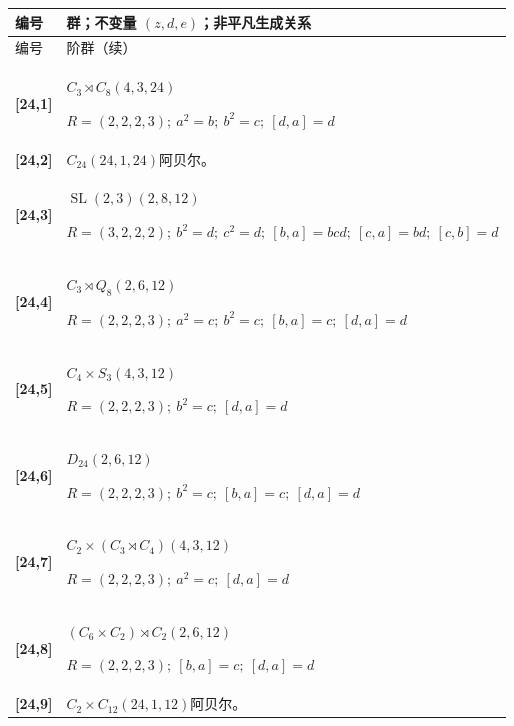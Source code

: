 \documentclass[UTF8,fontset=fandol,11pt,a4paper]{ctexart}
\begin{document}
\begin{longtable}{@{}p{17mm}>{\raggedright\arraybackslash}p{141mm}@{}}

\toprule 编号 & 群；不变量 $(z,d,e)$；非平凡生成关系\\\midrule\endfirsthead

\toprule 编号 & 24 阶群（续）\\\midrule\endhead\bottomrule\endfoot

\textbf{[24,1]} & $C_{3}\rtimes C_{8}$\quad $(4,3,24)$\par\(R=(2,2,2,3);\allowbreak\ a^{2}=b;\allowbreak\ b^{2}=c;\allowbreak\ [d,a]=d\)\\[3pt]

\textbf{[24,2]} & $C_{24}$\quad $(24,1,24)$\quad 阿贝尔。\\[3pt]

\textbf{[24,3]} & $\operatorname{SL}(2,3)$\quad $(2,8,12)$\par\(R=(3,2,2,2);\allowbreak\ b^{2}=d;\allowbreak\ c^{2}=d;\allowbreak\ [b,a]=bcd;\allowbreak\ [c,a]=bd;\allowbreak\ [c,b]=d\)\\[3pt]

\textbf{[24,4]} & $C_{3}\rtimes Q_{8}$\quad $(2,6,12)$\par\(R=(2,2,2,3);\allowbreak\ a^{2}=c;\allowbreak\ b^{2}=c;\allowbreak\ [b,a]=c;\allowbreak\ [d,a]=d\)\\[3pt]

\textbf{[24,5]} & $C_{4}\times S_{3}$\quad $(4,3,12)$\par\(R=(2,2,2,3);\allowbreak\ b^{2}=c;\allowbreak\ [d,a]=d\)\\[3pt]

\textbf{[24,6]} & $D_{24}$\quad $(2,6,12)$\par\(R=(2,2,2,3);\allowbreak\ b^{2}=c;\allowbreak\ [b,a]=c;\allowbreak\ [d,a]=d\)\\[3pt]

\textbf{[24,7]} & $C_{2}\times (C_{3}\rtimes C_{4})$\quad $(4,3,12)$\par\(R=(2,2,2,3);\allowbreak\ a^{2}=c;\allowbreak\ [d,a]=d\)\\[3pt]

\textbf{[24,8]} & $(C_{6}\times C_{2})\rtimes C_{2}$\quad $(2,6,12)$\par\(R=(2,2,2,3);\allowbreak\ [b,a]=c;\allowbreak\ [d,a]=d\)\\[3pt]

\textbf{[24,9]} & $C_{2}\times C_{12}$\quad $(24,1,12)$\quad 阿贝尔。\\[3pt]


\end{longtable}
\end{document}
